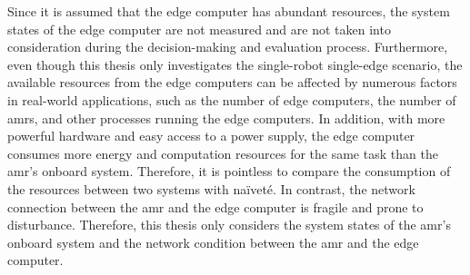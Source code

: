 Since it is assumed that the edge computer has abundant resources, the system states of the edge computer are not measured and are not taken into consideration during the decision-making and evaluation process. Furthermore, even though this thesis only investigates the single-robot single-edge scenario, the available resources from the edge computers can be affected by numerous factors in real-world applications, such as the number of edge computers, the number of \glspl{amr}, and other processes running the edge computers. In addition, with more powerful hardware and easy access to a power supply, the edge computer consumes more energy and computation resources for the same task than the \gls{amr}'s onboard system. Therefore, it is pointless to compare the consumption of the resources between two systems with na\"{i}vet\'{e}. In contrast, the network connection between the \gls{amr} and the edge computer is fragile and prone to disturbance. Therefore, this thesis only considers the system states of the \gls{amr}'s onboard system and the network condition between the \gls{amr} and the edge computer. 
